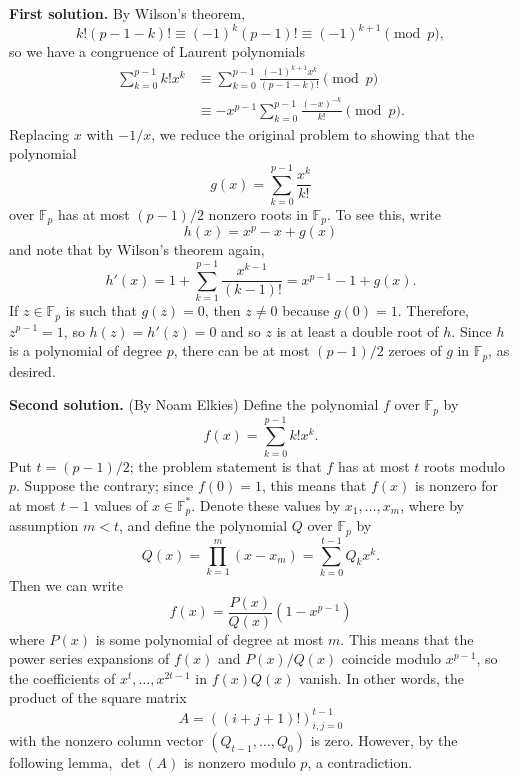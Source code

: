\documentclass[amssymb,twocolumn,pra,10pt,aps]{revtex4-1}
\newcommand{\FF}{\mathbb{F}}
\begin{document}
\begin{itemize}
\textbf{First solution.}
By Wilson's theorem,
\[
k! (p-1-k)! \equiv (-1)^{k} (p-1)! \equiv (-1)^{k+1} \pmod{p},
\]
so we have a congruence of Laurent polynomials
\begin{align*}
\sum_{k=0}^{p-1} k! x^k &\equiv \sum_{k=0}^{p-1} \frac{(-1)^{k+1} x^k}{(p-1-k)!} \pmod{p} \\
&\equiv -x^{p-1} \sum_{k=0}^{p-1} \frac{(-x)^{-k}}{k!} \pmod{p}.
\end{align*}
Replacing $x$ with $-1/x$, we reduce the original problem to showing that the polynomial
\[
g(x) = \sum_{k=0}^{p-1} \frac{x^k}{k!}
\]
over $\FF_p$ has at most $(p-1)/2$ nonzero roots in $\FF_p$. To see this, write
\[
h(x) = x^p - x + g(x)
\]
and note that by Wilson's theorem again,
\[
h'(x) = 1 + \sum_{k=1}^{p-1} \frac{x^{k-1}}{(k-1)!} = x^{p-1} - 1 + g(x).
\]
If $z \in \FF_p$ is such that $g(z) = 0$, then $z \neq 0$ because $g(0) = 1$.
Therefore, $z^{p-1} = 1$, so $h(z) = h'(z) = 0$ and so $z$ is at least a double root of $h$.
Since $h$ is a polynomial of degree $p$, there can be at most $(p-1)/2$ zeroes of $g$ in $\FF_p$, as desired.

\noindent
\textbf{Second solution.} (By Noam Elkies)
Define the polynomial $f$ over $\FF_p$ by
\[
f(x) = \sum_{k=0}^{p-1} k! x^k.
\]
Put $t = (p-1)/2$; the problem statement is that $f$
has at most $t$ roots modulo $p$.
Suppose the contrary; since $f(0) = 1$,
this means that $f(x)$ is nonzero for at most $t-1$ values of $x \in \FF_p^*$.
Denote these values by $x_1,\dots,x_m$, where by assumption $m < t$, and define the polynomial
$Q$ over $\FF_p$ by
\[
Q(x) =
\prod_{k=1}^m (x - x_m) = \sum_{k=0}^{t-1} Q_k x^k.
\]
Then we can write
\[
f(x) = \frac{P(x)}{Q(x)} (1-x^{p-1})
\]
where $P(x)$ is some polynomial of degree at most $m$.
This means that the power series expansions of $f(x)$ and $P(x)/Q(x)$ coincide modulo $x^{p-1}$,
so the coefficients of $x^t, \dots, x^{2t-1}$ in $f(x) Q(x)$ vanish.
In other words, the product of the square matrix
\[
A = ((i+j+1)!)_{i,j=0}^{t-1}
\]
with the nonzero column vector $(Q_{t-1}, \dots, Q_0)$ is zero.
However, by the following lemma, $\det(A)$ is nonzero modulo $p$, a contradiction.


\end{itemize}
\end{document}
